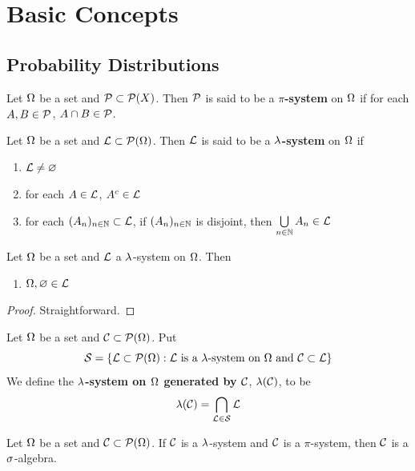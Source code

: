 \documentclass{book}
\begin{document}
	\chapter{Basic Concepts}
	\section{Probability Distributions}
	
	\begin{defn}
		Let $\Omega$ be a set and $\mathcal{P} \subset \mathcal{P}(X)$. Then $\mathcal{P}$ is said to be a \textbf{$\pi$-system} on $\Omega$ if for each $A,B \in \mathcal{P}$, $A \cap B \in \mathcal{P}$.
	\end{defn}
	
	\begin{defn}
		Let $\Omega$ be a set and $\mathcal{L} \subset \mathcal{P}(\Omega)$. Then $\mathcal{L}$ is said to be a \textbf{$\lambda$-system} on $\Omega$ if 
		\begin{enumerate}
			\item $\mathcal{L} \neq \varnothing$
			\item for each $A \in \mathcal{L}$, $A^c \in \mathcal{L}$
			\item for each $(A_n)_{n \in \mathbb{N}} \subset \mathcal{L}$, if $(A_n)_{n \in \mathbb{N}}$ is disjoint, then $\bigcup\limits_{n \in \mathbb{N}}A_n \in \mathcal{L}$
		\end{enumerate}
	\end{defn}
	
	\begin{ex}
		Let $\Omega$ be a set and $\mathcal{L}$ a $\lambda$-system on $\Omega$. Then 
		\begin{enumerate}
			\item $\Omega, \varnothing \in \mathcal{L}$
		\end{enumerate} 
	\end{ex}
	
	\begin{proof}
		Straightforward.
	\end{proof}
	
	\begin{defn}
		Let $\Omega$ be a set and $\mathcal{C} \subset \mathcal{P}(\Omega)$. Put $$\mathcal{S} = \{\mathcal{L} \subset \mathcal{P}(\Omega): \mathcal{L} \text{ is a }\lambda\text{-system on }\Omega \text{ and } \mathcal{C} \subset \mathcal{L}\}$$ We define the \textbf{$\lambda$-system on $\Omega$ generated by $\mathcal{C}$}, $\lambda(\mathcal{C})$, to be $$\lambda(\mathcal{C}) = \bigcap_{\mathcal{L} \in \mathcal{S}}\mathcal{L}$$
	\end{defn}
	
	\begin{ex}
		Let $\Omega$ be a set and $\mathcal{C} \subset \mathcal{P}(\Omega)$. If $\mathcal{C}$ is a $\lambda$-system and $\mathcal{C}$ is a $\pi$-system, then $\mathcal{C}$ is a $\sigma$-algebra.
	\end{ex}
	
\end{document}
